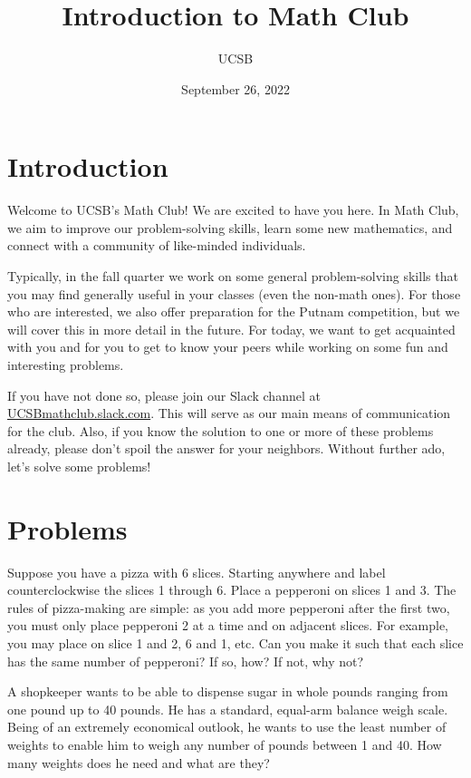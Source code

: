\documentclass{article}
\title{Introduction to Math Club}
\author{UCSB}
\date{September 26, 2022}
\begin{document}
\section{Introduction}

Welcome to UCSB's Math Club! 
We are excited to have you here. 
In Math Club, we aim to improve our problem-solving skills, learn some new mathematics, and connect with a community of like-minded individuals.

Typically, in the fall quarter we work on some general problem-solving skills that you may find generally useful in your classes (even the non-math ones). 
For those who are interested, we also offer preparation for the Putnam competition, but we will cover this in more detail in the future.
For today, we want to get acquainted with you and for you to get to know your peers while working on some fun and interesting problems.

If you have not done so, please join our Slack channel at \href{UCSBmathclub.slack.com}{UCSBmathclub.slack.com}. 
This will serve as our main means of communication for the club.
Also, if you know the solution to one or more of these problems already, please don't spoil the answer for your neighbors.
Without further ado, let's solve some problems!

\section{Problems}

\begin{exercise}
    Suppose you have a pizza with 6 slices.
    Starting anywhere and label counterclockwise the slices 1 through 6.
    Place a pepperoni on slices 1 and 3.
    The rules of pizza-making are simple: as you add more pepperoni after the first two, you must only place pepperoni 2 at a time and on adjacent slices. 
    For example, you may place on slice 1 and 2, 6 and 1, etc.
    Can you make it such that each slice has the same number of pepperoni? 
    If so, how?
    If not, why not?
\end{exercise}

\begin{exercise}
    A shopkeeper wants to be able to dispense sugar in whole pounds ranging from one pound up to 40 pounds.
    He has a standard, equal-arm balance weigh scale.
    Being of an extremely economical outlook, he wants to use the least number of weights to enable him to weigh any number of pounds between 1 and 40.
    How many weights does he need and what are they?
\end{exercise}
\end{document}
